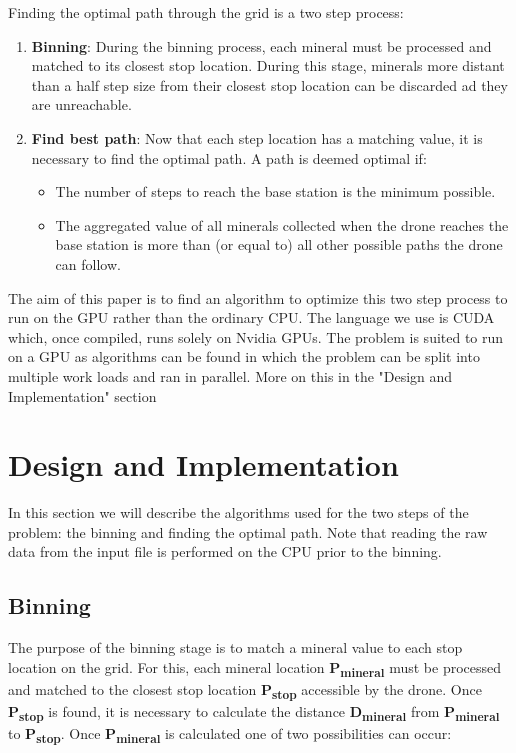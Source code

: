 \documentclass[11pt]{IEEEtran}
\begin{document}
Finding the optimal path through the grid is a two step process:
\begin{enumerate}
  \item \textbf{Binning}: During the binning process, each mineral must be processed and matched to its closest stop location. During this stage, minerals more distant than a half step size from their closest stop location can be discarded ad they are unreachable.
  \item \textbf{Find best path}: Now that each step location has a matching value, it is necessary to find the optimal path. A path is deemed optimal if:
  \begin{itemize}
  \item The number of steps to reach the base station is the minimum possible.
  \item The aggregated value of all minerals collected when the drone reaches the base station is more than (or equal to) all other possible paths the drone can follow.\\
  \end{itemize}
\end{enumerate}

The aim of this paper is to find an algorithm to optimize this two step process to run on the GPU rather than the ordinary CPU. The language we use is CUDA which, once compiled, runs solely on Nvidia GPUs. The problem is suited to run on a GPU as algorithms can be found in which the problem can be split into multiple work loads and ran in parallel. More on this in the "Design and Implementation" section

\section{Design and Implementation}
In this section we will describe the algorithms used for the two steps of the problem: the binning and finding the optimal path. Note that reading the raw data from the input file is performed on the CPU prior to the binning.
\subsection{Binning}
The purpose of the binning stage is to match a mineral value to each stop location on the grid. For this, each mineral location  \textbf{P\textsubscript{mineral}} must be processed and matched to the closest stop location \textbf{P\textsubscript{stop}} accessible by the drone. Once \textbf{P\textsubscript{stop}} is found, it is necessary to calculate the distance \textbf{D\textsubscript{mineral}} from \textbf{P\textsubscript{mineral}}  to \textbf{P\textsubscript{stop}}. Once \textbf{P\textsubscript{mineral}} is calculated one of two possibilities can occur:
\end{document}
